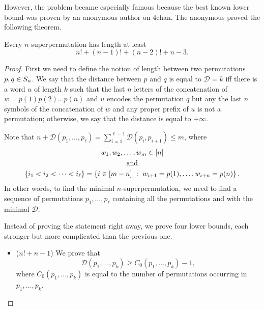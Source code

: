 However, the problem became especially famous because the best known lower bound
was proven by an anonymous author on 4chan. The anonymous proved the following
theorem.
\begin{theorem}
  Every $n$-superpermutation has length at least
  \[
    n! + (n - 1)! + (n - 2)! + n - 3.
  \]
\end{theorem}
\begin{proof}
  First we need to define the notion of length between two permutations
  $p, q \in S_{n}$. We say that the distance between $p$ and $q$ is equal to
  $\mathcal{D} = k$
  iff there is a word $u$ of length $k$ such that the last $n$ letters of the
  concatenation of  $w = p(1) p(2) \dots p(n)$ and $u$ encodes the permutation
  $q$ but any the last $n$ symbols of the concatenation of $w$ and any proper
  prefix of $u$ is not a permutation; otherwise, we say that the distance is
  equal to $+\infty$.

  Note that $n + \mathcal{D}(p_1, \dots, p_\ell) =
  \sum_{i = 1}^{\ell - 1} \mathcal{D}(p_i, p_{i + 1}) \le m$, where
  \begin{gather*}
    w_1, w_2, \dots, w_m \in \range{n} \\
    \text{and} \\
    \set{i_1 < i_2 < \dots < i_\ell} =
    \set[{
      w_{i + 1} = p(1), \dots, w_{i + n} = p(n)
    }]{
      i \in \range{m - n}
    }.
  \end{gather*}
  In other words, to find the minimal $n$-superpermutation, we need to find
  a sequence of permutations $p_1, \dots, p_\ell$ containing all the permutations
  and with the minimal $\mathcal{D}$.

  Instead of proving the statement right away, we prove four lower bounds, each
  stronger but more complicated than the previous one.

  \begin{itemize}
    \item ($n! + n - 1$) We prove that
      \begin{equation}
        \label{equation:inequality-1}
        \mathcal{D}(p_1, \dots, p_k) \ge
        C_0(p_1, \dots, p_k) - 1,
      \end{equation}
      where $C_0(p_1, \dots, p_k)$ is equal to
      the number of permutations occurring in $p_1, \dots, p_k$.


\end{itemize}
\end{proof}
